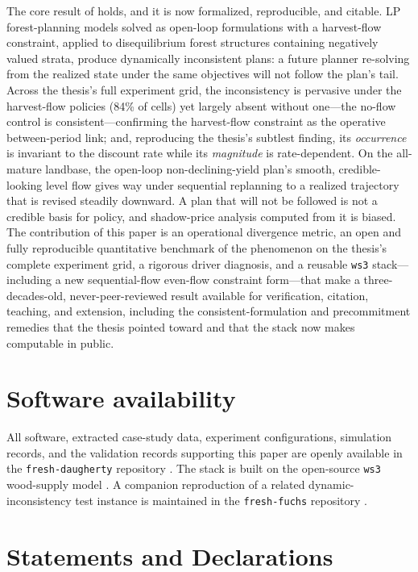 \documentclass[12pt]{article}
\begin{document}
The core result of \citet{daugherty1991credibility} holds, and it is now formalized, reproducible, and citable. LP forest-planning models solved as open-loop formulations with a harvest-flow constraint, applied to disequilibrium forest structures containing negatively valued strata, produce dynamically inconsistent plans: a future planner re-solving from the realized state under the same objectives will not follow the plan's tail. Across the thesis's full experiment grid, the inconsistency is pervasive under the harvest-flow policies (84\% of cells) yet largely absent without one---the no-flow control is consistent---confirming the harvest-flow constraint as the operative between-period link; and, reproducing the thesis's subtlest finding, its \emph{occurrence} is invariant to the discount rate while its \emph{magnitude} is rate-dependent. On the all-mature landbase, the open-loop non-declining-yield plan's smooth, credible-looking level flow gives way under sequential replanning to a realized trajectory that is revised steadily downward. A plan that will not be followed is not a credible basis for policy, and shadow-price analysis computed from it is biased. The contribution of this paper is an operational divergence metric, an open and fully reproducible quantitative benchmark of the phenomenon on the thesis's complete experiment grid, a rigorous driver diagnosis, and a reusable \texttt{ws3} stack---including a new sequential-flow even-flow constraint form---that make a three-decades-old, never-peer-reviewed result available for verification, citation, teaching, and extension, including the consistent-formulation and precommitment remedies that the thesis pointed toward and that the stack now makes computable in public.

\section{Software availability}

All software, extracted case-study data, experiment configurations, simulation records, and the validation records supporting this paper are openly available in the \texttt{fresh-daugherty} repository \citep{freshdaugherty}. The stack is built on the open-source \texttt{ws3} wood-supply model \citep{paradis2026ws3}. A companion reproduction of a related dynamic-inconsistency test instance is maintained in the \texttt{fresh-fuchs} repository \citep{freshfuchs}.


\section*{Statements and Declarations}
\end{document}
